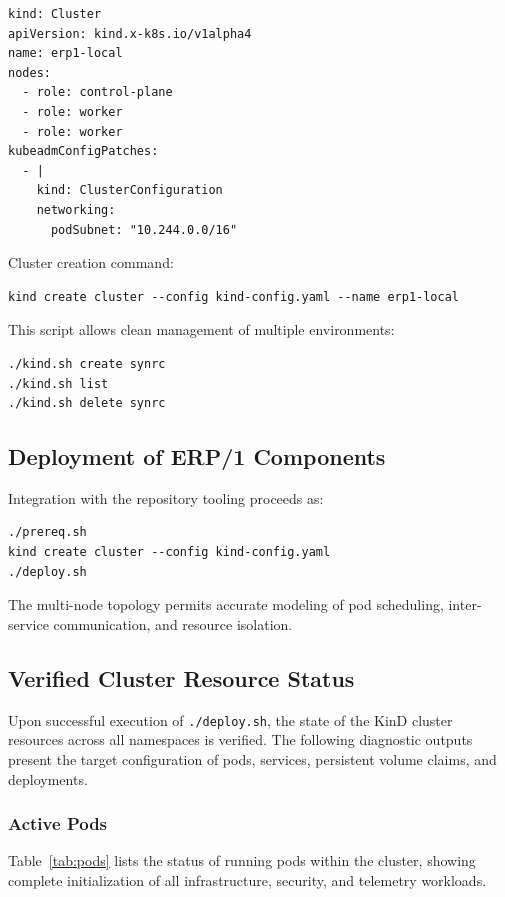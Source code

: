 \documentclass{article}
\begin{document}
\begin{verbatim}
kind: Cluster
apiVersion: kind.x-k8s.io/v1alpha4
name: erp1-local
nodes:
  - role: control-plane
  - role: worker
  - role: worker
kubeadmConfigPatches:
  - |
    kind: ClusterConfiguration
    networking:
      podSubnet: "10.244.0.0/16"
\end{verbatim}

Cluster creation command:

\begin{verbatim}
kind create cluster --config kind-config.yaml --name erp1-local
\end{verbatim}

This script allows clean management of multiple environments:

\begin{verbatim}
./kind.sh create synrc
./kind.sh list
./kind.sh delete synrc
\end{verbatim}

\subsection{Deployment of ERP/1 Components}

Integration with the repository tooling proceeds as:

\begin{verbatim}
./prereq.sh
kind create cluster --config kind-config.yaml
./deploy.sh
\end{verbatim}

The multi-node topology permits accurate modeling of pod scheduling, inter-service communication, and resource isolation.

\subsection{Verified Cluster Resource Status}

Upon successful execution of \texttt{./deploy.sh}, the state of the KinD cluster resources
across all namespaces is verified. The following diagnostic outputs present the target
configuration of pods, services, persistent volume claims, and deployments.

\subsubsection{Active Pods}

Table~\ref{tab:pods} lists the status of running pods within the cluster,
showing complete initialization of all infrastructure, security, and telemetry workloads.
\end{document}
